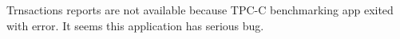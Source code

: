 \documentclass[../../main.tex]{subfiles}
\begin{document}
    Trnsactions reports are not available because TPC-C benchmarking app exited with error.  It seems this application has serious bug.
\end{document}

